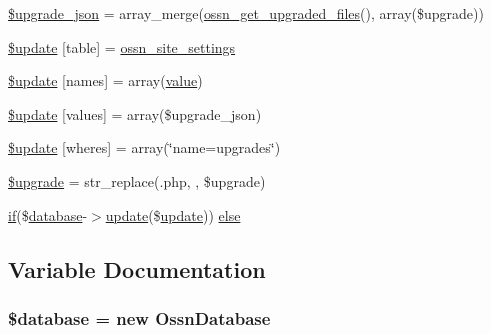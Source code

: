 \begin{DoxyCompactItemize}
\item 
\hyperlink{1411396351_8php_a512525d0f5eb608ac72ca7b85e5fbf65}{\$upgrade\+\_\+json} = array\+\_\+merge(\hyperlink{ossn_8lib_8upgrade_8php_a984d0f1ee4273d739939d28d00a8bedb}{ossn\+\_\+get\+\_\+upgraded\+\_\+files}(), array(\$upgrade))
\item 
\hyperlink{1411396351_8php_aee7ba5985ddf023a93862ab77e9718f9}{\$update} \mbox{[}\textquotesingle{}table\textquotesingle{}\mbox{]} = \textquotesingle{}\hyperlink{ossn_8lib_8system_8php_a610e2045b8a86c09f777b4d82e24e34c}{ossn\+\_\+site\+\_\+settings}\textquotesingle{}
\item 
\hyperlink{1411396351_8php_abcf5ad2e4fef35de04bef0168cc91ddc}{\$update} \mbox{[}\textquotesingle{}names\textquotesingle{}\mbox{]} = array(\textquotesingle{}\hyperlink{fullpage_2plugin_8min_8js_ac56c57897e10f699d124e0103921aa20}{value}\textquotesingle{})
\item 
\hyperlink{1411396351_8php_ac82a75b4c6df37380ff77c88f041785e}{\$update} \mbox{[}\textquotesingle{}values\textquotesingle{}\mbox{]} = array(\$upgrade\+\_\+json)
\item 
\hyperlink{1411396351_8php_aacde4479a904b32d0f24dea4e01f148c}{\$update} \mbox{[}\textquotesingle{}wheres\textquotesingle{}\mbox{]} = array(\char`\"{}name=\textquotesingle{}upgrades\textquotesingle{}\char`\"{})
\item 
\hyperlink{1411396351_8php_a9084097ce600d3cc7a79a20ecaea9906}{\$upgrade} = str\+\_\+replace(\textquotesingle{}.php\textquotesingle{}, \textquotesingle{}\textquotesingle{}, \$upgrade)
\item 
\hyperlink{jquery_8tokeninput_8js_ad8dd46a3cbc004569e34401e9e71771a}{if}(\$\hyperlink{ossn_8config_8db_8example_8php_a4e0ca996705612048240f76ff8d4da95}{database}-\/$>$\hyperlink{_chart_8_doughnut_8js_ad58a8121caa8678969d1ff32848a77c4}{update}(\$\hyperlink{_chart_8_doughnut_8js_ad58a8121caa8678969d1ff32848a77c4}{update})) \hyperlink{1411396351_8php_aa7c58ee9f19ec0c0f3a1951839273e79}{else}
\end{DoxyCompactItemize}


\subsection{Variable Documentation}
\subsubsection[{\texorpdfstring{\$database}{$database}}]{\setlength{\rightskip}{0pt plus 5cm}\${\bf database} = new {\bf Ossn\+Database}}\hypertarget{1411396351_8php_a7691c0162d89de0b6ba47edcd8ba8878}{}\label{1411396351_8php_a7691c0162d89de0b6ba47edcd8ba8878}


